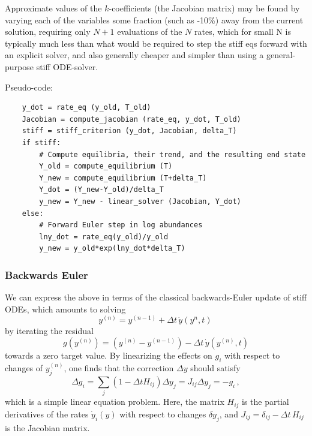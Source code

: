 \documentclass[paper=a4,fontsize=11pt]{scrartcl}
\numberwithin{equation}{section}		%
\numberwithin{figure}{section}			%
\numberwithin{table}{section}				%
\newcommand{\codecolor}{\color{Blue}}
\begin{document}
Approximate values of the $k$-coefficients (the Jacobian matrix) may be found by varying each of the variables some fraction (such as -10\%) away from the current solution, requiring only $N+1$ evaluations of the $N$ rates, which for small N is typically much less than what would be required to step the stiff eqs forward with an explicit solver, and also generally cheaper and simpler than using a general-purpose stiff ODE-solver.

Pseudo-code:
{\small\codecolor\begin{verbatim}
    y_dot = rate_eq (y_old, T_old)
    Jacobian = compute_jacobian (rate_eq, y_dot, T_old)
    stiff = stiff_criterion (y_dot, Jacobian, delta_T)
    if stiff:
        # Compute equilibria, their trend, and the resulting end state
        Y_old = compute_equilibrium (T)
        Y_new = compute_equilibrium (T+delta_T)
        Y_dot = (Y_new-Y_old)/delta_T
        y_new = Y_new - linear_solver (Jacobian, Y_dot)
    else:
        # Forward Euler step in log abundances
        lny_dot = rate_eq(y_old)/y_old
        y_new = y_old*exp(lny_dot*delta_T)
\end{verbatim}}

\subsubsection{Backwards Euler}
We can express the above in terms of the classical backwards-Euler update of stiff ODEs, which amounts to solving
\begin{equation}
    y^{(n)} = y^{(n-1)} + \Delta t \, \dot{y}(y^{n},t) \,
\end{equation}
by iterating the residual
\begin{equation}
    g(y^{(n)}) = (y^{(n)} - y^{(n-1)}) - \Delta t \, \dot{y}(y^{(n)},t)
\end{equation}
towards a zero target value.  By linearizing the effects on $g_i$ with respect to changes of $y_j^{(n)}$, one finds that the correction $\Delta y$ should satisfy
\begin{equation}
    \Delta g_i = \sum_j (1-\Delta t H_{ij})\Delta y_j = J_{ij}\Delta y_j  = -g_i\,,
\end{equation}
which is a simple linear equation problem.  Here, the matrix $H_{ij}$ is the partial derivatives of the rates $\dot{y}_i(y)$ with respect to changes $\delta y_j$, and $J_{ij} = \delta_{ij} - \Delta t\,H_{ij}$ is the Jacobian matrix.
\end{document}
